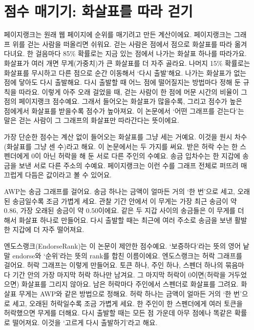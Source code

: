 \section*{점수 매기기: 화살표를 따라 걷기}

페이지랭크는 원래 웹 페이지에 순위를 매기려고 만든 계산이에요. 페이지랭크는 그래프 위를 걷는 사람을 떠올리면 쉬워요. 걷는 사람은 점에서 점으로 화살표를 따라 옮겨 다녀요. 한 걸음마다 85\% 확률로는 지금 있는 점에서 나가는 화살표 하나를 따라가요. 화살표가 여러 개면 무게(가중치)가 큰 화살표를 더 자주 골라요. 나머지 15\% 확률로는 화살표를 무시하고 다른 점으로 순간 이동해서 ‘다시 출발’해요. 나가는 화살표가 없는 점에 닿아도 다시 출발해요. 다시 출발할 때 어느 점에 떨어질지는 방법마다 정해 둔 규칙을 따라요. 이렇게 아주 오래 걸었을 때, 걷는 사람이 한 점에 머문 시간의 비율이 그 점의 페이지랭크 점수예요. 그래서 들어오는 화살표가 많을수록, 그리고 점수가 높은 점에게서 화살표를 받을수록 점수가 높아져요. 이 논문에서 ‘어떤 그래프를 걷는다’는 말은 걷는 사람이 그 그래프의 화살표만 따라간다는 뜻이에요.

가장 단순한 점수는 계산 없이 들어오는 화살표를 그냥 세는 거예요. 이것을 원시 차수(화살표를 그냥 센 수)라고 해요. 이 논문에서는 두 가지를 써요. 받은 허락 수는 한 스펜더에게 0이 아닌 허락을 해 둔 서로 다른 주인의 수예요. 송금 입차수는 한 지갑에 송금을 보낸 서로 다른 주소의 수예요. 페이지랭크는 이런 수를 그래프 전체로 퍼뜨려 매끄럽게 다듬은 값이라고 볼 수 있어요.

AWP는 송금 그래프를 걸어요. 송금 하나는 금액이 얼마든 거의 ‘한 번’으로 세고, 오래된 송금일수록 조금 가볍게 세요. 관찰 기간 안에서 이 무게는 가장 최근 송금이 약 $0.86$, 가장 오래된 송금이 약 $0.50$이에요. 같은 두 지갑 사이의 송금들은 이 무게를 더해서 화살표 하나로 만들어요. 다시 출발할 때는 최근에 여러 주소로 송금을 보낸 활발한 지갑에 더 자주 떨어져요.

엔도스랭크(EndorseRank)는 이 논문이 제안한 점수예요. ‘보증하다’라는 뜻의 영어 낱말 endorse와 ‘순위’라는 뜻의 rank를 합친 이름이에요. 엔도스랭크는 허락 그래프를 걸어요. 허락 그래프는 이렇게 만들어요. 토큰 하나, 주인 하나, 스펜더 하나의 묶음마다 기간 안의 가장 마지막 허락 하나만 남겨요. 그 마지막 허락이 0이면(허락을 거두었으면) 화살표를 그리지 않아요. 남은 허락마다 주인에서 스펜더로 화살표를 그려요. 화살표 무게는 AWP와 같은 방법으로 정해요. 허락 하나는 금액이 얼마든 거의 ‘한 번’으로 세고, 오래된 허락일수록 조금 가볍게 세요. 한 주인이 한 스펜더에게 여러 토큰을 허락했으면 무게를 더해요. 다시 출발할 때는 모든 점 가운데 아무 점에나 똑같은 확률로 떨어져요. 이것을 ‘고르게 다시 출발하기’라고 해요.

